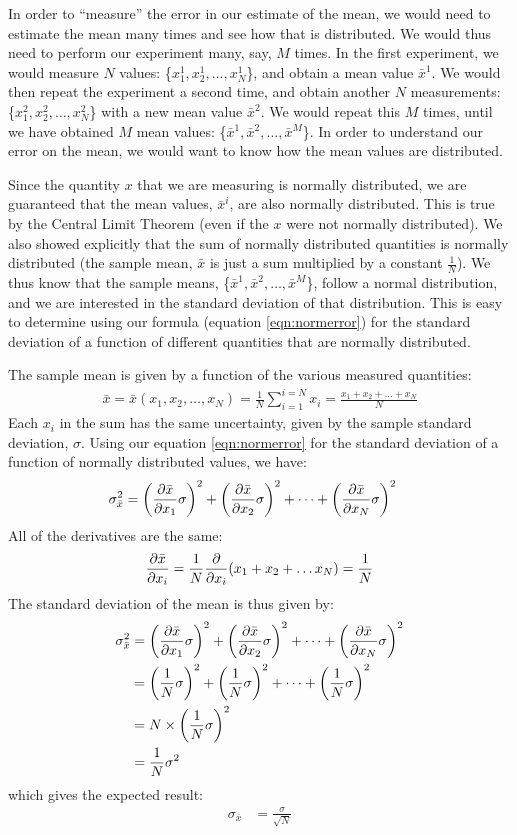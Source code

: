 In order to ``measure'' the error in our estimate of the mean, we would need to estimate the mean many times and see how that is distributed. We would thus need to perform our experiment many, say, $M$ times. In the first experiment, we would measure $N$ values: \{$x^1_1, x^1_2, \dots,x^1_N$\}, and obtain a mean value $\bar x^1$. We would then repeat the experiment a second time, and obtain another $N$ measurements:  \{$x^2_1, x^2_2, \dots,x^2_N$\} with a new mean value $\bar x^2$. We would repeat this $M$ times, until we have obtained $M$ mean values: \{$\bar x^1, \bar x^2, \dots, \bar x^M$\}. In order to understand our error on the mean, we would want to know how the mean values are distributed.

Since the quantity $x$ that we are measuring is normally distributed, we are guaranteed that the mean values, $\bar x^i$, are also normally distributed. This is true by the Central Limit Theorem (even if the $x$ were not normally distributed). We also showed explicitly that the sum of normally distributed quantities is normally distributed (the sample mean, $\bar x$ is just a sum multiplied by a constant $\frac{1}{N}$). We thus know that the sample means, \{$\bar x^1, \bar x^2, \dots, \bar x^M$\}, follow a normal distribution, and we are interested in the standard deviation of that distribution. This is easy to determine using our formula (equation \ref{eqn:normerror}) for the standard deviation of a function of different quantities that are normally distributed.

The sample mean is given by a function of the various measured quantities:
\begin{align}
\bar{x} =\bar x(x_1,x_2,\dots,x_N)= \frac{1}{N} \sum_{i=1}^{i=N} x_i =\frac{x_1+x_2+\dots+x_N}{N}
\end{align}
Each $x_i$ in the sum has the same uncertainty, given by the sample standard deviation, $\sigma$. Using our equation \ref{eqn:normerror} for the standard deviation of a function of normally distributed values, we have:
\begin{align*}
\sigma_{\bar x}^2&=\left(\frac{\partial \bar x}{\partial x_1}\sigma\right)^2+\left(\frac{\partial \bar x}{\partial x_2}\sigma\right)^2+\dots+\left(\frac{\partial \bar x}{\partial x_N}\sigma\right)^2
\end{align*}
All of the derivatives are the same:
\begin{align*}
\frac{\partial \bar x}{\partial x_i}=\frac{1}{N}\frac{\partial }{\partial x_i}(x_1+x_2+\dots x_N)=\frac{1}{N}
\end{align*}
The standard deviation of the mean is thus given by:
\begin{align}
\sigma_{\bar x}^2&=\left(\frac{\partial \bar x}{\partial x_1}\sigma\right)^2+\left(\frac{\partial \bar x}{\partial x_2}\sigma\right)^2+\dots+\left(\frac{\partial \bar x}{\partial x_N}\sigma\right)^2\nonumber\\
&=\left(\frac{1}{N}\sigma\right)^2+\left(\frac{1}{N}\sigma\right)^2+\dots+\left(\frac{1}{N}\sigma\right)^2\nonumber\\
&=N\times\left(\frac{1}{N}\sigma\right)^2\nonumber\\
&=\frac{1}{N}\sigma^2
\end{align}
which gives the expected result:
\begin{align}
\sigma_{\bar x}&=\frac{\sigma}{\sqrt{N}}
\end{align}

